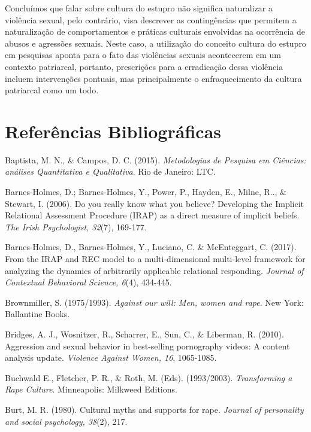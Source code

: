 Concluímos que falar sobre cultura do estupro não significa naturalizar a violência sexual, pelo contrário, visa descrever as contingências que permitem a naturalização de comportamentos e práticas culturais envolvidas na ocorrência de abusos e agressões sexuais. Neste caso, a utilização do conceito cultura do estupro em pesquisas aponta para o fato das violências sexuais acontecerem em um contexto patriarcal, portanto, prescrições para a erradicação dessa violência incluem intervenções pontuais, mas principalmente o enfraquecimento da cultura patriarcal como um todo.
\vfill
\pagebreak
\section*{Referências Bibliográficas}

\hangindent=25pt
\noindent Baptista, M. N., \& Campos, D. C. (2015). \textit{Metodologias de Pesquisa em Ciências: análises Quantitativa e Qualitativa}. Rio de Janeiro: LTC.

\hangindent=25pt
\noindent Barnes-Holmes, D.; Barnes-Holmes, Y., Power, P., Hayden, E., Milne, R.., \& Stewart, I. (2006). Do you really know what you believe? Developing the Implicit Relational Assessment Procedure (IRAP) as a direct measure of implicit beliefs. \textit{The Irish Psychologist, 32}(7), 169-177. 

\hangindent=25pt
\noindent Barnes-Holmes, D., Barnes-Holmes, Y., Luciano, C. \& McEnteggart, C. (2017). From the IRAP and REC model to a multi-dimensional multi-level framework for analyzing the dynamics of arbitrarily applicable relational responding. \textit{Journal of Contextual Behavioral Science, 6}(4), 434-445.

\hangindent=25pt
\noindent Brownmiller, S. (1975/1993). \textit{Against our will: Men, women and rape}. New York: Ballantine Books.

\hangindent=25pt
\noindent Bridges, A. J., Wosnitzer, R., Scharrer, E., Sun, C., \& Liberman, R. (2010). Aggression and sexual behavior in best-selling pornography videos: A content analysis update. \textit{Violence Against Women, 16}, 1065-1085.

\hangindent=25pt
\noindent Buchwald E., Fletcher, P. R., \& Roth, M. (Eds). (1993/2003). \textit{Transforming a Rape Culture}. Minneapolis: Milkweed Editions.

\hangindent=25pt
\noindent Burt, M. R. (1980). Cultural myths and supports for rape. \textit{Journal of personality and social psychology, 38}(2), 217.

